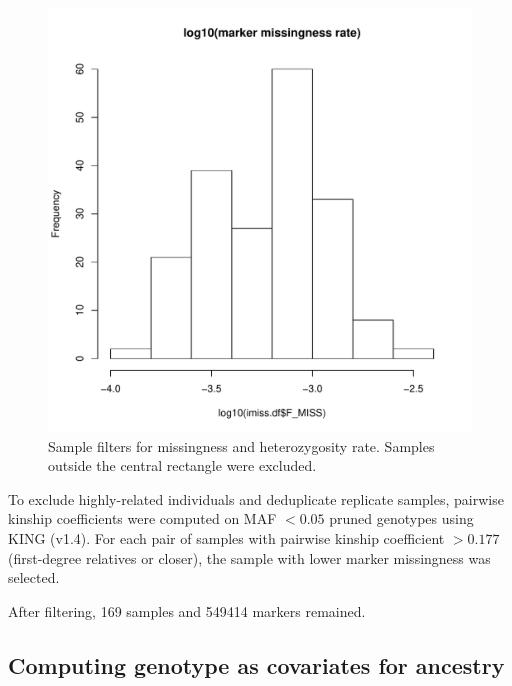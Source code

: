 \begin{figure}
    \includegraphics[width=1.0\textwidth,page=2]{mainmatter/figures/chapter_02/coreex_eQTLflu_20171204.gencall.smajor.impute_sex.qc2.pdf}
    \caption{Sample filters for missingness and heterozygosity rate. Samples outside the central rectangle were excluded.}
    \label{fig:hird_genotype_sample_hetRate_missingness}
\end{figure}

To exclude highly-related individuals and deduplicate replicate samples, pairwise kinship coefficients were computed on \gls{MAF} $< 0.05$ pruned genotypes using KING (v1.4).
For each pair of samples with pairwise kinship coefficient $> 0.177$ (first-degree relatives or closer), the sample with lower marker missingness was selected.

After filtering, 169 samples and 549414 markers remained.

\subsection{Computing genotype  as covariates for ancestry}
\label{subsec:hird_dge_genotype_pc}


